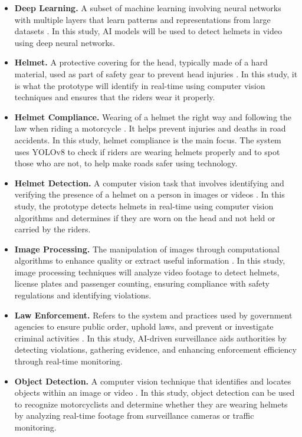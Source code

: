 \begin{refsection}
\begin{itemize}
    \item \textbf{Deep Learning.} A subset of machine learning involving neural networks with multiple layers that learn patterns and representations from large datasets \cite{Goodfellow2016}. In this study, AI models will be used to detect helmets in video using deep neural networks.

    \item \textbf{Helmet.} A protective covering for the head, typically made of a hard material, used as part of safety gear to prevent head injuries \cite{MerriamHelmet}. In this study, it is what the prototype will identify in real-time using computer vision techniques and ensures that the riders wear it properly. 

    \item \textbf{Helmet Compliance.} Wearing of a helmet the right way and following the law when riding a motorcycle \cite{WHO2018}. It helps prevent injuries and deaths in road accidents. In this study, helmet compliance is the main focus. The system uses YOLOv8 to check if riders are wearing helmets properly and to spot those who are not, to help make roads safer using technology.

    \item \textbf{Helmet Detection.} A computer vision task that involves identifying and verifying the presence of a helmet on a person in images or videos \cite{Hayat2022}. In this study, the prototype detects helmets in real-time using computer vision algorithms and determines if they are worn on the head and not held or carried by the riders.

    \item \textbf{Image Processing.} The manipulation of images through computational algorithms to enhance quality or extract useful information \cite{Gonzalez2018}. In this study, image processing techniques will analyze video footage to detect helmets, license plates and passenger counting, ensuring compliance with safety regulations and identifying violations.

    \item \textbf{Law Enforcement.} Refers to the system and practices used by government agencies to ensure public order, uphold laws, and prevent or investigate criminal activities \cite{BritannicaLaw}. In this study, AI-driven surveillance aids authorities by detecting violations, gathering evidence, and enhancing enforcement efficiency through real-time monitoring.

    \item \textbf{Object Detection.} A computer vision technique that identifies and locates objects within an image or video \cite{Tian2019}. In this study, object detection can be used to recognize motorcyclists and determine whether they are wearing helmets by analyzing real-time footage from surveillance cameras or traffic monitoring.


\end{itemize}
\end{refsection}

